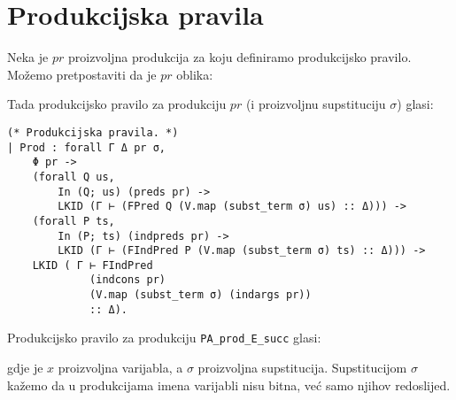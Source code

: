 \section{Produkcijska pravila}
Neka je \(pr\) proizvoljna produkcija za koju definiramo produkcijsko pravilo.
Možemo pretpostaviti da je \(pr\) oblika:
\begin{prooftree}
\end{prooftree}
\noindent Tada produkcijsko pravilo za produkciju \(pr\) (i proizvoljnu supstituciju \(\sigma\)) glasi:
\begin{prooftree}
\end{prooftree}
\begin{verbatim}
(* Produkcijska pravila. *)
| Prod : forall Γ Δ pr σ,
    Φ pr ->
    (forall Q us,
        In (Q; us) (preds pr) ->
        LKID (Γ ⊢ (FPred Q (V.map (subst_term σ) us) :: Δ))) ->
    (forall P ts,
        In (P; ts) (indpreds pr) ->
        LKID (Γ ⊢ (FIndPred P (V.map (subst_term σ) ts) :: Δ))) ->
    LKID ( Γ ⊢ FIndPred
             (indcons pr)
             (V.map (subst_term σ) (indargs pr))
             :: Δ).
\end{verbatim}

\begin{example}
  Produkcijsko pravilo za produkciju \texttt{PA\_prod\_E\_succ} glasi:
  \begin{prooftree}
  \end{prooftree}
  \noindent gdje je \(x\) proizvoljna varijabla, a \(\sigma\) proizvoljna supstitucija.
  Supstitucijom \(\sigma\) kažemo da u produkcijama imena varijabli nisu bitna,
  već samo njihov redoslijed.
\end{example}

